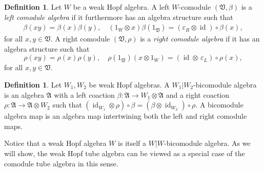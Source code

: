 \documentclass[a4paper,11pt]{article}
\theoremstyle{definition}
\newtheorem{definition}[theorem]{Definition}
\theoremstyle{remark}
\newtheorem{remark}[theorem]{Remark}
\newcommand{\id}{\operatorname{id}}
\begin{document}
\begin{definition}
    Let $W$ be a weak Hopf algebra.  A left $W$-comodule $(\mathfrak{V},\beta)$ is a \textit{left comodule algebra} if it furthermore has an algebra structure such that 
    \begin{gather} \label{eq:left-comod-alg-def}
        \beta(xy) = \beta(x)\beta(y), \quad (1_W\otimes x)\beta(1_\mathfrak{V}) = (\varepsilon_R\otimes \id)\circ \beta(x),
    \end{gather}
    for all $x,y\in \mathfrak{V}$. 
    A right comodule $(\mathfrak{V},\rho)$ is a \textit{right comodule algebra} if it has an algebra structure such that 
    \begin{equation} \label{eq:right-comod-alg-def}
        \rho(xy) = \rho(x)\rho(y), \quad\rho(1_\mathfrak{V})(x\otimes 1_W) = (\id \otimes \,\varepsilon_L)\circ\rho(x),
    \end{equation}
    for all $x,y\in \mathfrak{V}$.
\end{definition}


\begin{definition}
    Let $W_1,W_2$ be weak Hopf algebras. A $W_1|W_2$-bicomodule algebra is an algebra $\mathfrak{A}$ with a left coaction $\beta:\mathfrak{A} \to W_1\otimes \mathfrak{A}$ and a right coaction $\rho:\mathfrak{A}\to \mathfrak{A}\otimes W_2$ such that $(\id_{W_1}\otimes \rho)\circ \beta = (\beta\otimes \id_{W_2})\circ \rho$. 
    A bicomodule algebra map is an algebra map intertwining both the left and right comodule maps.
\end{definition}

Notice that a weak Hopf algebra $W$ is itself a $W|W$-bicomodule algebra. As we will show, the weak Hopf tube algebra can be viewed as a special case of the comodule tube algebra in this sense.
\end{document}
